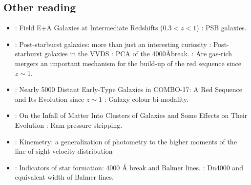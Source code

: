 \subsection{Other reading}
\begin{itemize}
\item \citet{2004ApJ...609..683T} : {Field E+A Galaxies at Intermediate Redshifts ($0.3 < z < 1$)} : PSB galaxies.
\item \citet{2009MNRAS.395..144W} : {Post-starburst galaxies: more than just an interesting curiosity} : {Post-starburst galaxies in the VVDS : PCA of the 4000\AA break.} : Are gas-rich mergers an important mechanism for the build-up of the red sequence since $z\sim1$.
    \item \citet{2004ApJ...608..752B} : {Nearly 5000 Distant Early-Type Galaxies in COMBO-17: A Red Sequence and Its Evolution since $z\sim1$} : Galaxy colour bi-modality.
\item \citet{1972ApJ...176....1G} : {On the Infall of Matter Into Clusters of Galaxies and Some Effects on Their Evolution} : Ram pressure stripping.
\item \citet{2006MNRAS.366..787K} : {Kinemetry: a generalization of photometry to the higher moments of the line-of-sight velocity distribution}
\item \citet{1997A&A...325.1025P} : {Indicators of star formation: 4000 {\r{A}} break and Balmer lines.} : Dn4000 and equivalent width of Balmer lines.
\end{itemize}